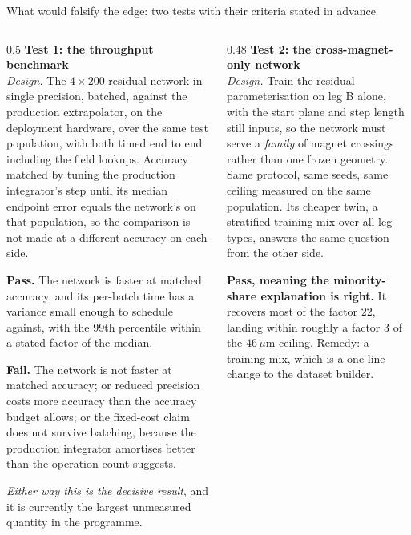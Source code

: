 \documentclass[aspectratio=169,10pt]{beamer}
\newcommand{\um}{\ensuremath{\,\mu\mathrm{m}}}
\newcommand{\hl}[1]{{\color{accent}\textbf{#1}}}
\newcommand{\bad}[1]{{\color{warm}\textbf{#1}}}
\begin{document}
\begin{frame}[shrink=25]{What would falsify the edge: two tests with their criteria stated in advance}
  \vspace{1mm}
  \begin{columns}[T]
    \begin{column}{0.5\textwidth}
      \textbf{Test 1: the throughput benchmark}\\[2pt]
      {\small \emph{Design.} The $4\times200$ residual network in single
       precision, batched, against the production extrapolator, on the
       deployment hardware, over the same test population, with both timed
       end to end including the field lookups. Accuracy matched by tuning the
       production integrator's step until its median endpoint error equals the
       network's on that population, so the comparison is not made at a
       different accuracy on each side.}
      \smallskip

      {\footnotesize \hl{Pass.} The network is faster at matched accuracy, and
       its per-batch time has a variance small enough to schedule against, with
       the 99th percentile within a stated factor of the median.}
      \smallskip

      {\footnotesize \bad{Fail.} The network is not faster at matched accuracy;
       or reduced precision costs more accuracy than the accuracy budget allows;
       or the fixed-cost claim does not survive batching, because the production
       integrator amortises better than the operation count suggests.}
      \smallskip

      {\footnotesize \emph{Either way this is the decisive result}, and it is
       currently the largest unmeasured quantity in the programme.}
    \end{column}
    \begin{column}{0.48\textwidth}
      \textbf{Test 2: the cross-magnet-only network}\\[2pt]
      {\small \emph{Design.} Train the residual parameterisation on leg B alone,
       with the start plane and step length still inputs, so the network must
       serve a \emph{family} of magnet crossings rather than one frozen
       geometry. Same protocol, same seeds, same ceiling measured on the same
       population. Its cheaper twin, a stratified training mix over all leg
       types, answers the same question from the other side.}
      \smallskip

      {\footnotesize \hl{Pass, meaning the minority-share explanation is right.}
       It recovers most of the factor $22$, landing within roughly a factor $3$
       of the $46\um$ ceiling. Remedy: a training mix, which is a one-line
       change to the dataset builder.}
      \smallskip


\end{column}
\end{columns}
\end{frame}
\end{document}
